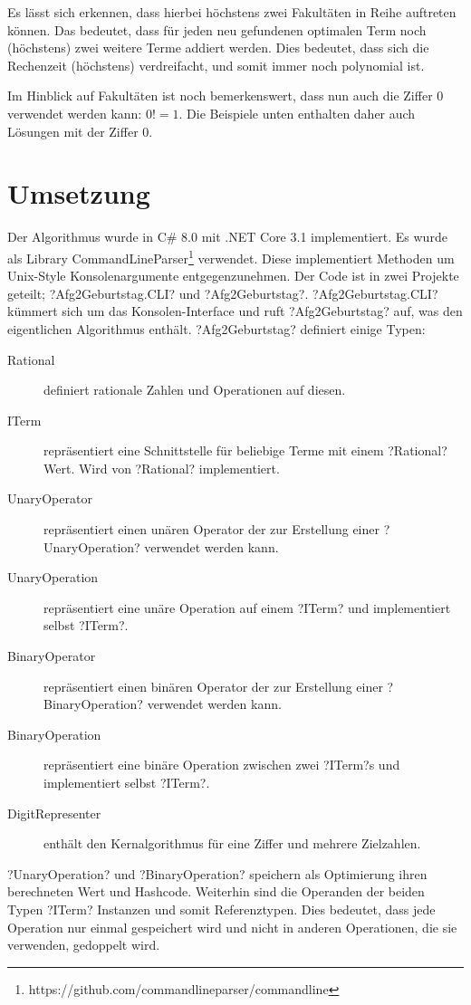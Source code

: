 \documentclass{article}
\theoremstyle{nonumberplain}
\begin{document}
Es lässt sich erkennen, dass hierbei höchstens zwei Fakultäten in Reihe auftreten können.
Das bedeutet, dass für jeden neu gefundenen optimalen Term noch (höchstens) zwei weitere Terme addiert werden.
Dies bedeutet, dass sich die Rechenzeit (höchstens) verdreifacht, und somit immer noch polynomial ist.

Im Hinblick auf Fakultäten ist noch bemerkenswert, dass nun auch die Ziffer \(0\) verwendet werden kann:
\(0! = 1\).
Die Beispiele unten enthalten daher auch Lösungen mit der Ziffer \(0\).

\section{Umsetzung}

Der Algorithmus wurde in C\# 8.0 mit .NET Core 3.1 implementiert.
Es wurde als Library CommandLineParser\footnote{https://github.com/commandlineparser/commandline} verwendet. Diese implementiert Methoden um Unix-Style Konsolenargumente entgegenzunehmen.
Der Code ist in zwei Projekte geteilt;
?Afg2Geburtstag.CLI? und ?Afg2Geburtstag?.
?Afg2Geburtstag.CLI? kümmert sich um das Konsolen-Interface und ruft ?Afg2Geburtstag? auf, was den eigentlichen Algorithmus enthält.
?Afg2Geburtstag? definiert einige Typen:

\begin{description}
    \item[Rational] definiert rationale Zahlen und Operationen auf diesen.
    \item[ITerm] repräsentiert eine Schnittstelle für beliebige Terme mit einem ?Rational? Wert. Wird von ?Rational? implementiert.
    \item[UnaryOperator] repräsentiert einen unären Operator der zur Erstellung einer ?UnaryOperation? verwendet werden kann.
    \item[UnaryOperation] repräsentiert eine unäre Operation auf einem ?ITerm? und implementiert selbst ?ITerm?.
    \item[BinaryOperator] repräsentiert einen binären Operator der zur Erstellung einer ?BinaryOperation? verwendet werden kann.
    \item[BinaryOperation] repräsentiert eine binäre Operation zwischen zwei ?ITerm?s und implementiert selbst ?ITerm?.
    \item[DigitRepresenter] enthält den Kernalgorithmus für eine Ziffer und mehrere Zielzahlen.
\end{description}

?UnaryOperation? und ?BinaryOperation? speichern als Optimierung ihren berechneten Wert und Hashcode.
Weiterhin sind die Operanden der beiden Typen ?ITerm? Instanzen und somit Referenztypen.
Dies bedeutet, dass jede Operation nur einmal gespeichert wird und nicht in anderen Operationen, die sie verwenden, gedoppelt wird.
\end{document}

